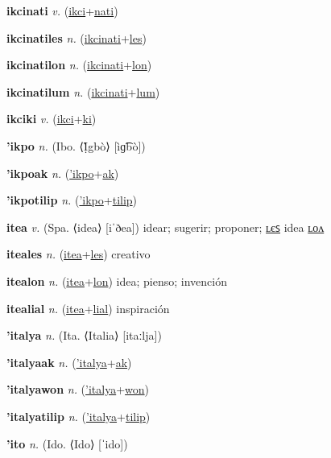 \textbf{\hypertarget{ikcinati}{ikcinati}} \textit{v.} (\hyperlink{ikci}{ikci}+\allowbreak \hyperlink{nati}{nati})


\textbf{\hypertarget{ikcinatiles}{ikcinatiles}} \textit{n.} (\hyperlink{ikcinati}{ikcinati}+\allowbreak \hyperlink{les}{les})


\textbf{\hypertarget{ikcinatilon}{ikcinatilon}} \textit{n.} (\hyperlink{ikcinati}{ikcinati}+\allowbreak \hyperlink{lon}{lon})


\textbf{\hypertarget{ikcinatilum}{ikcinatilum}} \textit{n.} (\hyperlink{ikcinati}{ikcinati}+\allowbreak \hyperlink{lum}{lum})


\textbf{\hypertarget{ikciki}{ikciki}} \textit{v.} (\hyperlink{ikci}{ikci}+\allowbreak \hyperlink{ki}{ki})


\textbf{\hypertarget{'ikpo}{'ikpo}} \textit{n.} (Ibo. ⟨Ị̀gbò⟩ [ìɡ͡bò])


\textbf{\hypertarget{'ikpoak}{'ikpoak}} \textit{n.} (\hyperlink{'ikpo}{'ikpo}+\allowbreak \hyperlink{ak}{ak})


\textbf{\hypertarget{'ikpotilip}{'ikpotilip}} \textit{n.} (\hyperlink{'ikpo}{'ikpo}+\allowbreak \hyperlink{tilip}{tilip})


\textbf{\hypertarget{itea}{itea}} \textit{v.} (Spa. ⟨idea⟩ [iˈðea])
idear; sugerir; proponer; \hyperlink{iteales}{ʟєꜱ} idea \hyperlink{itealon}{ʟᴏᴧ}

\textbf{\hypertarget{iteales}{iteales}} \textit{n.} (\hyperlink{itea}{itea}+\allowbreak \hyperlink{les}{les})
creativo

\textbf{\hypertarget{itealon}{itealon}} \textit{n.} (\hyperlink{itea}{itea}+\allowbreak \hyperlink{lon}{lon})
idea; pienso; invención

\textbf{\hypertarget{itealial}{itealial}} \textit{n.} (\hyperlink{itea}{itea}+\allowbreak \hyperlink{lial}{lial})
inspiración

\textbf{\hypertarget{'italya}{'italya}} \textit{n.} (Ita. ⟨Italia⟩ [itaːlja])


\textbf{\hypertarget{'italyaak}{'italyaak}} \textit{n.} (\hyperlink{'italya}{'italya}+\allowbreak \hyperlink{ak}{ak})


\textbf{\hypertarget{'italyawon}{'italyawon}} \textit{n.} (\hyperlink{'italya}{'italya}+\allowbreak \hyperlink{won}{won})


\textbf{\hypertarget{'italyatilip}{'italyatilip}} \textit{n.} (\hyperlink{'italya}{'italya}+\allowbreak \hyperlink{tilip}{tilip})


\textbf{\hypertarget{'ito}{'ito}} \textit{n.} (Ido. ⟨Ido⟩ [ˈido])


